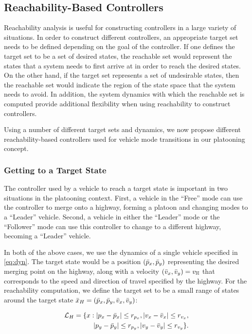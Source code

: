 \subsection{Reachability-Based Controllers \label{sec:reach_ctrl}}
Reachability analysis is useful for constructing controllers in a large variety of situations. In order to construct different controllers, an appropriate target set needs to be defined depending on the goal of the controller. If one defines the target set to be a set of desired states, the reachable set would represent the states that a system needs to first arrive at in order to reach the desired states. On the other hand, if the target set represents a set of undesirable states, then the reachable set would indicate the region of the state space that the system needs to avoid. In addition, the system dynamics with which the reachable set is computed provide additional flexibility when using reachability to construct controllers.

Using a number of different target sets and dynamics, we now propose different reachability-based controllers used for vehicle mode transitions in our platooning concept.

\subsubsection{Getting to a Target State \label{sec:abs_target_ctrl}}
The controller used by a vehicle to reach a target state is important in two situations in the platooning context. First, a vehicle in the ``Free'' mode can use the controller to merge onto a highway, forming a platoon and changing modes to a ``Leader'' vehicle. Second, a vehicle in either the ``Leader'' mode or the ``Follower'' mode can use this controller to change to a different highway, becoming a ``Leader'' vehicle. 

In both of the above cases, we use the dynamics of a single vehicle specified in \eqref{eq:dyn}. The target state would be a position $(\bar{p}_x, \bar{p}_y)$ representing the desired merging point on the highway, along with a velocity $(\bar{v}_x, \bar{v}_y)=v_{\mathbb{H}}$ that corresponds to the speed and direction of travel specified by the highway. For the reachability computation, we define the target set to be a small range of states around the target state $\bar x_H = (\bar{p}_x, \bar{p}_y, \bar{v}_x, \bar{v}_y)$:

\begin{equation}
\begin{aligned}
\mathcal{L}_H = \{x: |p_x-\bar{p}_x|\le r_{p_x}, |v_x-\bar{v}_x|\le r_{v_x}, \\
|p_y - \bar{p}_y| \le r_{p_y}, |v_y - \bar{v}_y|\le r_{v_y} \}.
\end{aligned}
\end{equation}

